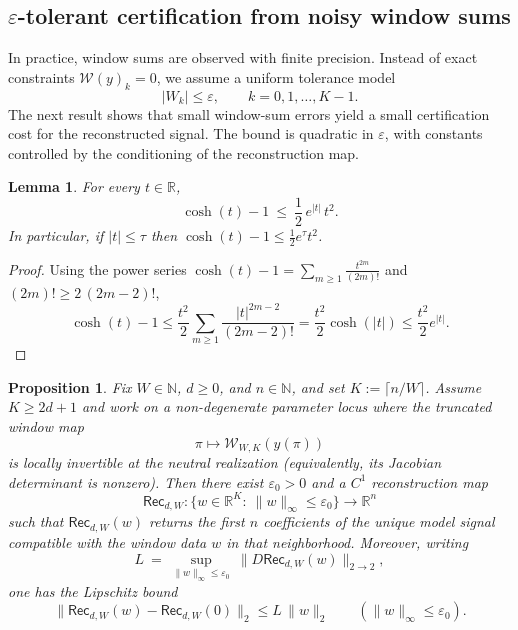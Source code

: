 \documentclass[11pt,reqno]{amsart}
\newtheorem{proposition}[theorem]{Proposition}
\newtheorem{lemma}[theorem]{Lemma}
\theoremstyle{definition}
\theoremstyle{remark}
\newcommand{\R}{\mathbb{R}}
\newcommand{\1}{\mathbf{1}}
\providecommand{\N}{\mathbb{N}}
\begin{document}
\subsection{\texorpdfstring{$\varepsilon$}{eps}-tolerant certification from noisy window sums}\label{subsec:eps-stability}
In practice, window sums are observed with finite precision. Instead of exact constraints
$\mathcal{W}(y)_k=0$, we assume a uniform tolerance model
\begin{equation}\label{eq:window-noise}
\bigl|W_k\bigr|\le \varepsilon,\qquad k=0,1,\dots,K-1.
\end{equation}
The next result shows that small window-sum errors yield a small certification cost for the
reconstructed signal. The bound is quadratic in $\varepsilon$, with constants controlled by the
conditioning of the reconstruction map.

\begin{lemma}\label{lem:cosh-upper}
For every $t\in\R$,
\[
\cosh(t)-1 \ \le\ \frac12\,e^{|t|}\,t^2.
\]
In particular, if $|t|\le \tau$ then $\cosh(t)-1\le \frac12 e^{\tau}t^2$.
\end{lemma}

\begin{proof}
Using the power series $\cosh(t)-1=\sum_{m\ge 1}\frac{t^{2m}}{(2m)!}$ and $(2m)!\ge 2\,(2m-2)!$,
\[
\cosh(t)-1 \le \frac{t^2}{2}\sum_{m\ge 1}\frac{|t|^{2m-2}}{(2m-2)!}
= \frac{t^2}{2}\cosh(|t|)\le \frac{t^2}{2}e^{|t|}.
\]
\end{proof}


\begin{proposition}\label{prop:rec-exists}
Fix $W\in\N$, $d\ge 0$, and $n\in\N$, and set $K:=\lceil n/W\rceil$.
Assume $K\ge 2d+1$ and work on a non-degenerate parameter locus where the truncated window map
\[
\pi\longmapsto \mathcal{W}_{W,K}(y(\pi))
\]
is locally invertible at the neutral realization (equivalently, its Jacobian determinant is nonzero).
Then there exist $\varepsilon_0>0$ and a $C^1$ reconstruction map
\[
\mathsf{Rec}_{d,W}:\{w\in\R^K:\ \|w\|_\infty\le \varepsilon_0\}\to\R^n
\]
such that $\mathsf{Rec}_{d,W}(w)$ returns the first $n$ coefficients of the unique model signal
compatible with the window data $w$ in that neighborhood. Moreover, writing
\[
L\:=\ \sup_{\|w\|_\infty\le \varepsilon_0}\ \bigl\|D\mathsf{Rec}_{d,W}(w)\bigr\|_{2\to 2},
\]
one has the Lipschitz bound
\[
\|\mathsf{Rec}_{d,W}(w)-\mathsf{Rec}_{d,W}(0)\|_2\le L\,\|w\|_2\qquad(\|w\|_\infty\le \varepsilon_0).
\]
\end{proposition}
\end{document}
